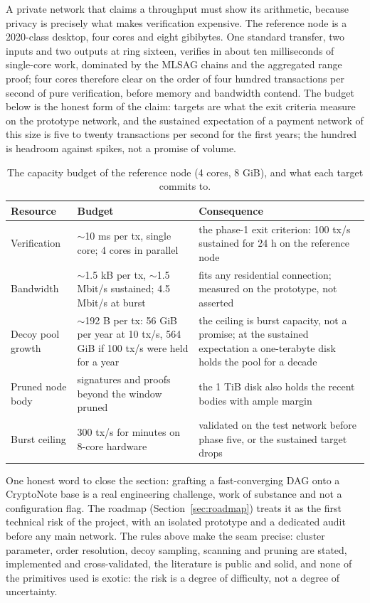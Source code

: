 A private network that claims a throughput must show its arithmetic,
because privacy is precisely what makes verification expensive. The
reference node is a 2020-class desktop, four cores and eight gibibytes.
One standard transfer, two inputs and two outputs at ring sixteen,
verifies in about ten milliseconds of single-core work, dominated by the
MLSAG chains and the aggregated range proof; four cores therefore clear on
the order of four hundred transactions per second of pure verification,
before memory and bandwidth contend. The budget below is the honest form
of the claim: targets are what the exit criteria measure on the prototype
network, and the sustained expectation of a payment network of this size
is five to twenty transactions per second for the first years; the hundred
is headroom against spikes, not a promise of volume.

\begin{table}[htbp]
\centering
\small
\caption{The capacity budget of the reference node (4 cores, 8 GiB), and
what each target commits to.}
\label{tab:capacity}
\begin{tabularx}{\textwidth}{@{}L{3.1cm}Y Y@{}}
\toprule
Resource & Budget & Consequence \\
\midrule
Verification & $\sim$10 ms per tx, single core; 4 cores in parallel & the phase-1 exit criterion: 100 tx/s sustained for 24 h on the reference node \\
Bandwidth & $\sim$1.5 kB per tx, $\sim$1.5 Mbit/s sustained; 4.5 Mbit/s at burst & fits any residential connection; measured on the prototype, not asserted \\
Decoy pool growth & $\sim$192 B per tx: 56 GiB per year at 10 tx/s, 564 GiB if 100 tx/s were held for a year & the ceiling is burst capacity, not a promise; at the sustained expectation a one-terabyte disk holds the pool for a decade \\
Pruned node body & signatures and proofs beyond the window pruned & the 1 TiB disk also holds the recent bodies with ample margin \\
Burst ceiling & 300 tx/s for minutes on 8-core hardware & validated on the test network before phase five, or the sustained target drops \\
\bottomrule
\end{tabularx}
\end{table}

One honest word to close the section: grafting a fast-converging DAG onto
a CryptoNote base is a real engineering challenge, work of substance and
not a configuration flag. The roadmap (Section~\ref{sec:roadmap}) treats
it as the first technical risk of the project, with an isolated prototype
and a dedicated audit before any main network. The rules above make the
seam precise: cluster parameter, order resolution, decoy sampling,
scanning and pruning are stated, implemented and cross-validated, the
literature is public and solid, and none of the primitives used is exotic:
the risk is a degree of difficulty, not a degree of uncertainty.
